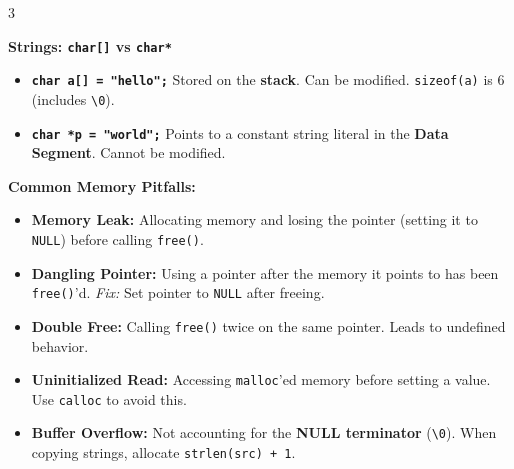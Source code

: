 \documentclass[10pt,landscape]{article}
\begin{document}
\begin{multicols*}{3}
{        \textbf{Strings: \texttt{char[]} vs \texttt{char*}}
        \begin{itemize}
            \item \textbf{\texttt{char a[] = "hello";}} Stored on the \textbf{stack}. Can be modified. \texttt{sizeof(a)} is 6 (includes \texttt{\textbackslash 0}).
            \item \textbf{\texttt{char *p = "world";}} Points to a constant string literal in the \textbf{Data Segment}. Cannot be modified.
        \end{itemize}

        \textbf{Common Memory Pitfalls:}
        \begin{itemize}
            \item \textbf{Memory Leak:} Allocating memory and losing the pointer (setting it to \texttt{NULL}) before calling \texttt{free()}.
            \item \textbf{Dangling Pointer:} Using a pointer after the memory it points to has been \texttt{free()}'d. \textit{Fix:} Set pointer to \texttt{NULL} after freeing.
            \item \textbf{Double Free:} Calling \texttt{free()} twice on the same pointer. Leads to undefined behavior.
            \item \textbf{Uninitialized Read:} Accessing \texttt{malloc}'ed memory before setting a value. Use \texttt{calloc} to avoid this.
            \item \textbf{Buffer Overflow:} Not accounting for the \textbf{NULL terminator} (\texttt{\textbackslash 0}). When copying strings, allocate \texttt{strlen(src) + 1}.
        \end{itemize}
    }


    
    

\end{multicols*}
\end{document}
